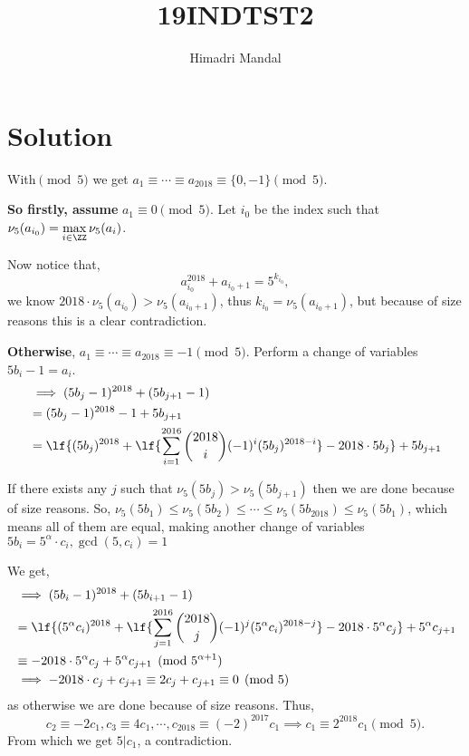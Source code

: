 \documentclass[11pt]{scrartcl}
\title{19INDTST2}
\author{Himadri Mandal}
\begin{document}
\maketitle

\section{Solution}
\raggedright
\begin{soln}
	With$\pmod{5}$ we get $a_1 \equiv \cdots \equiv a_{2018} \equiv \{0,-1\} \pmod{5}$.

	\textbf{So firstly, assume} $a_1 \equiv 0 \pmod{5}$. Let $i_0$ be the index such that $\nu_5(a_{i_0}) = \displaystyle\max_{i \in \ZZ}\nu_5(a_i)$. 

	Now notice that, 
	\[ a_{i_0}^{2018} + a_{i_0+1} = 5^{k_{i_0}}, \]
	we know $2018\cdot\nu_5(a_{i_0}) > \nu_5(a_{i_0 + 1})$, thus $k_{i_0} = \nu_5(a_{i_0+1})$, but because of size reasons this is a clear contradiction.

	\textbf{Otherwise}, $a_1 \equiv \cdots \equiv a_{2018} \equiv -1 \pmod{5}$. Perform a change of variables $5b_i-1=a_i$. 
	\begin{align*}
		&\implies(5b_j-1)^{2018}+(5b_{j+1}-1) \\
		&= (5b_{j}-1)^{2018}-1 + 5b_{j+1} \\
		&= \lf{(5b_{j})^{2018} + \lf{\sum_{i=1}^{2016} \binom{2018}{i}(-1)^{i}(5b_{j})^{2018-i}} - 2018\cdot5b_j } + 5b_{j+1}
	\end{align*}

	If there exists any $j$ such that $\nu_5(5b_j) > \nu_5(5b_{j+1})$ then we are done because of size reasons. So, $\nu_5(5b_1) \leq \nu_5(5b_2) \leq \cdots \leq \nu_5(5b_{2018}) \leq \nu_5(5b_{1})$, which means all of them are equal, making another change of variables $5b_i = 5^\alpha \cdot c_i, \gcd(5,c_i)=1$

	We get,
	\begin{align*}
	&\implies(5b_i-1)^{2018} + (5b_{i+1}-1)\\
	&= \lf{(5^{\alpha}c_i)^{2018} + \lf{\sum_{j=1}^{2016} \binom{2018}{j}(-1)^{j}(5^{\alpha}c_{i})^{2018-j}} - 2018\cdot 5^{\alpha}c_j } + 5^{\alpha}c_{j+1} \\
	&\equiv -2018 \cdot 5^{\alpha}c_j + 5^{\alpha}c_{j+1} \pmod{5^{\alpha+1}} \\
	&\implies -2018 \cdot c_j + c_{j+1} \equiv 2 c_j + c_{j+1} \equiv 0 \pmod{5}
	\end{align*}
	as otherwise we are done because of size reasons. Thus, \[c_2 \equiv -2c_1, c_3 \equiv 4c_1, \cdots, c_{2018} \equiv (-2)^{2017}c_1 \implies c_1 \equiv 2^{2018}c_1 \pmod{5}.\] 
	From which we get $5|c_1$, a contradiction.

\end{soln}
\end{document}
